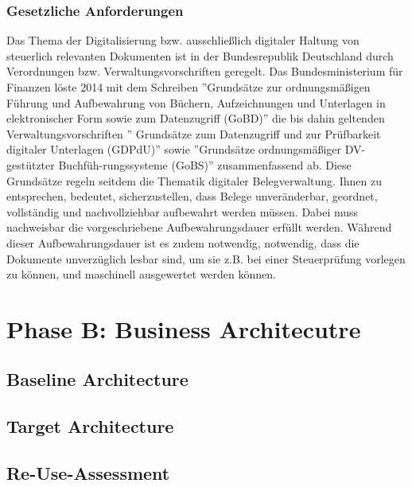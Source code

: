 \subsubsection{Gesetzliche Anforderungen}
Das Thema der Digitalisierung bzw. ausschließlich digitaler Haltung von steuerlich relevanten Dokumenten ist in der Bundesrepublik Deutschland durch Verordnungen bzw. Verwaltungsvorschriften geregelt.
Das Bundesministerium für Finanzen löste 2014 mit dem Schreiben  ''Grundsätze zur ordnungsmäßigen Führung und Aufbewahrung von Büchern, Aufzeichnungen und Unterlagen in elektronischer Form sowie zum Datenzugriff (GoBD)'' die bis dahin geltenden Verwaltungsvorschriften '' Grundsätze zum Datenzugriff und zur Prüfbarkeit digitaler Unterlagen (GDPdU)'' sowie ''Grundsätze ordnungsmäßiger DV-gestützter Buchfüh-rungssysteme (GoBS)'' zusammenfassend ab.
Diese Grundsätze regeln seitdem die Thematik digitaler Belegverwaltung.
Ihnen zu entsprechen, bedeutet, sicherzustellen, dass Belege unveränderbar, geordnet, vollständig und nachvollziehbar aufbewahrt werden müssen.
Dabei muss nachweisbar die vorgeschriebene Aufbewahrungsdauer erfüllt werden.
Während dieser Aufbewahrungsdauer ist es zudem notwendig, notwendig, dass die Dokumente unverzüglich lesbar sind, um sie z.B. bei einer Steuerprüfung vorlegen zu können, und maschinell ausgewertet werden können.





\section{Phase B: Business Architecutre}

\subsection{Baseline Architecture}

\subsection{Target Architecture}

\subsection{Re-Use-Assessment}

